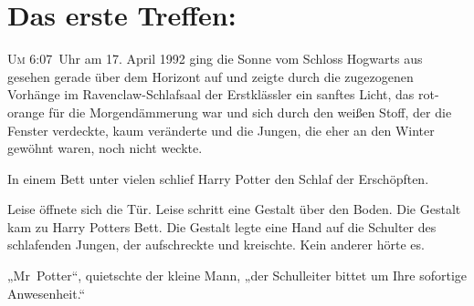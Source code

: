 
\section{Das erste Treffen:}

\lettrine{U}{m} 6:07~Uhr am 17. April 1992 ging die Sonne vom Schloss Hogwarts aus gesehen gerade über dem Horizont auf und zeigte durch die zugezogenen Vorhänge im Ravenclaw-Schlafsaal der Erstklässler ein sanftes Licht, das rot-orange für die Morgendämmerung war und sich durch den weißen Stoff, der die Fenster verdeckte, kaum veränderte und die Jungen, die eher an den Winter gewöhnt waren, noch nicht weckte.

In einem Bett unter vielen schlief Harry Potter den Schlaf der Erschöpften.





Leise öffnete sich die Tür. Leise schritt eine Gestalt über den Boden. Die Gestalt kam zu Harry Potters Bett. Die Gestalt legte eine Hand auf die Schulter des schlafenden Jungen, der aufschreckte und kreischte. Kein anderer hörte es.

„Mr~Potter“, quietschte der kleine Mann, „der Schulleiter bittet um Ihre sofortige Anwesenheit.“


